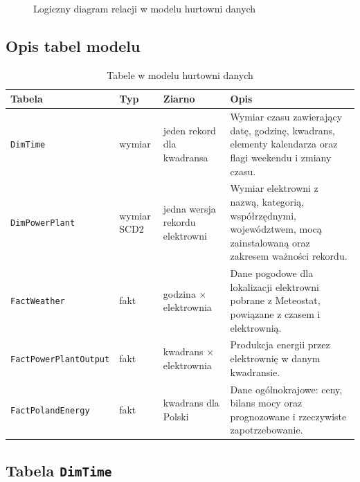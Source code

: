 \documentclass[12pt]{article}
\begin{document}
	\begin{figure}[h!]
		\centering
		\caption{Logiczny diagram relacji w modelu hurtowni danych}
	\end{figure}

	\subsection{Opis tabel modelu}

	\begin{table}[h!]
		\centering
		\small
		\begin{tabularx}{\textwidth}{|p{3.8cm}|p{2.0cm}|p{3.4cm}|X|}
			\hline
			\textbf{Tabela} & \textbf{Typ} & \textbf{Ziarno} & \textbf{Opis} \\
			\hline
			\texttt{DimTime} & wymiar & jeden rekord dla kwadransa & Wymiar czasu zawierający datę, godzinę, kwadrans, elementy kalendarza oraz flagi weekendu i zmiany czasu. \\
			\hline
			\texttt{DimPowerPlant} & wymiar SCD2 & jedna wersja rekordu elektrowni & Wymiar elektrowni z nazwą, kategorią, współrzędnymi, województwem, mocą zainstalowaną oraz zakresem ważności rekordu. \\
			\hline
			\texttt{FactWeather} & fakt & godzina $\times$ elektrownia & Dane pogodowe dla lokalizacji elektrowni pobrane z Meteostat, powiązane z czasem i elektrownią. \\
			\hline
			\texttt{FactPowerPlantOutput} & fakt & kwadrans $\times$ elektrownia & Produkcja energii przez elektrownię w danym kwadransie. \\
			\hline
			\texttt{FactPolandEnergy} & fakt & kwadrans dla Polski & Dane ogólnokrajowe: ceny, bilans mocy oraz prognozowane i rzeczywiste zapotrzebowanie. \\
			\hline
		\end{tabularx}
		\caption{Tabele w modelu hurtowni danych}
	\end{table}

	\subsection{Tabela \texttt{DimTime}}
\end{document}
